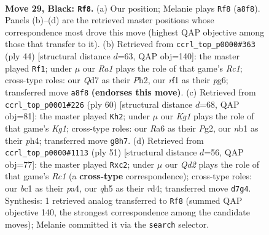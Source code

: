 \documentclass[11pt]{article}
\begin{document}
\clearpage

\begin{figure}[p]\centering
\begin{subfigure}{0.46\textwidth}\centering
\resizebox{\linewidth}{!}{%
\newchessgame
\chessboard[
  setfen={r5k1/2pq1p2/r6p/2p1p1pQ/2P1P1P1/3P4/7K/1NB2R2 b - - 15 29},
  showmover=false,
  pgfstyle=straightmove, color=movearrow, markmove={a8-f8}
]}
\caption{}
\end{subfigure}\hfill
\begin{subfigure}{0.46\textwidth}\centering
\resizebox{\linewidth}{!}{%
\newchessgame
\chessboard[
  setfen={4r1k1/2Q2p2/p2p2p1/1p1P4/6p1/1P2PqP1/P4P1P/2R3K1 w - - 1 23},
  showmover=false,
  pgfstyle=straightmove, color=movearrow, markmove={c1-f1}
]}
\caption{}
\end{subfigure}
\\[4pt]
\begin{subfigure}{0.46\textwidth}\centering
\resizebox{\linewidth}{!}{%
\newchessgame
\chessboard[
  setfen={3r2k1/2p2p2/1p4p1/1P1P1q2/p2Q1P1p/7P/P5P1/4R1K1 w - - 0 31},
  showmover=false,
  pgfstyle=straightmove, color=movearrow, markmove={g1-h2}
]}
\caption{}
\end{subfigure}\hfill
\begin{subfigure}{0.46\textwidth}\centering
\resizebox{\linewidth}{!}{%
\newchessgame
\chessboard[
  setfen={2r2r1k/6pp/1Q6/p7/Pp1R4/6Pq/1PB2P1P/R6K b - - 2 26},
  showmover=false,
  pgfstyle=straightmove, color=movearrow, markmove={c8-c2}
]}
\caption{}
\end{subfigure}
\caption{\textbf{Move 29, Black: \texttt{Rf8}.} (a) Our position; Melanie plays \texttt{Rf8} (\texttt{a8f8}). Panels (b)--(d) are the retrieved master positions whose correspondence most drove this move (highest QAP objective among those that transfer to it). (b) Retrieved from \texttt{ccrl\_top\_p0000\#363} (ply 44) [structural distance $d$=63, QAP obj=140]: the master played \texttt{Rf1}; under $\mu$ our \emph{Ra1} plays the role of that game's \emph{Rc1}; cross-type roles: our \emph{Q}d7 as their \emph{P}h2, our \emph{r}f1 as their \emph{p}g6; transferred move \texttt{a8f8} \textbf{(endorses this move)}. (c) Retrieved from \texttt{ccrl\_top\_p0001\#226} (ply 60) [structural distance $d$=68, QAP obj=81]: the master played \texttt{Kh2}; under $\mu$ our \emph{Kg1} plays the role of that game's \emph{Kg1}; cross-type roles: our \emph{R}a6 as their \emph{P}g2, our \emph{n}b1 as their \emph{p}h4; transferred move \texttt{g8h7}. (d) Retrieved from \texttt{ccrl\_top\_p0000\#1113} (ply 51) [structural distance $d$=56, QAP obj=77]: the master played \texttt{Rxc2}; under $\mu$ our \emph{Qd2} plays the role of that game's \emph{Rc1} (a \textbf{cross-type} correspondence); cross-type roles: our \emph{b}c1 as their \emph{p}a4, our \emph{q}h5 as their \emph{r}d4; transferred move \texttt{d7g4}. Synthesis: 1 retrieved analog transferred to \texttt{Rf8} (summed QAP objective 140, the strongest correspondence among the candidate moves); Melanie committed it via the \texttt{search} selector.}
\label{fig:thought-m57}
\end{figure}
\end{document}
